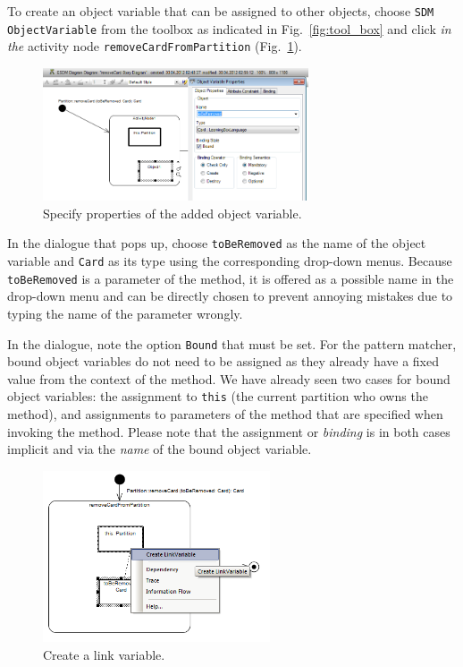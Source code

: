 To create an object variable that can be assigned to other objects, choose \texttt{SDM ObjectVariable} from the toolbox as indicated in
Fig.~\ref{fig:tool_box} and click \emph{in the} activity node \texttt{removeCardFromPartition} (Fig.~\ref{fig:object_variable_properties}). 


\begin{figure}[htp]
\begin{center}
  \includegraphics[width=0.7\textwidth]{pics/sdmBilder/removeCard/sdm10RAW}
  \caption{Specify properties of the added object variable.}  
  \label{fig:object_variable_properties}
\end{center}
\end{figure}

In the dialogue that pops up, choose \texttt{toBeRemoved} as the name of the object variable and \texttt{Card} as its type using the corresponding drop-down menus. 
Because \texttt{toBeRemoved} is a parameter of the method, it is offered as a possible name in the drop-down menu and can be directly chosen to prevent annoying mistakes due to typing the name of the parameter wrongly.

In the dialogue, note the option \texttt{Bound} that must be set.
For the pattern matcher, bound object variables do not need to be assigned as they already have a fixed value from the context of the method.  
We have already seen two cases  for bound object variables: the assignment to \texttt{this} (the current  partition who owns the method), and assignments to parameters of the 
method that  are specified when invoking the method.  
Please note that the assignment or \emph{binding} is in both cases implicit and via the \emph{name} of the bound object variable. 

\begin{figure}[htp]
\begin{center}
  \includegraphics[width=0.6\textwidth]{pics/sdmBilder/removeCard/sdm11RAW}
  \caption{Create a link variable.}   
  \label{fig:link_variable}
\end{center}
\end{figure}

